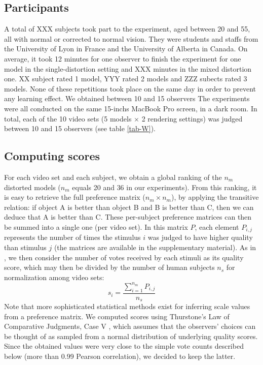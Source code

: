 \subsection{Participants}
A total of XXX subjects took part to the experiment, aged between 20 and 55, all with normal or corrected to normal vision. They were students and staffs from the University of Lyon in France and the University of Alberta in Canada. On average, it took 12 minutes for one observer to finish the experiment for one model in the single-distortion setting and XXX minutes in the mixed distortion one. XX subject rated 1 model, YYY rated 2 models and ZZZ subects rated 3 models. None of these repetitions took place on the same day in order to prevent any learning effect. We obtained between 10 and 15 observers The experiments were all conducted on the same 15-inchs MacBook Pro screen, in a dark room. In total, each of the 10 video sets (5 models $\times$ 2 rendering settings) was judged between 10 and 15 observers (see table \ref{tab-W}).\\
\subsection{Computing scores}
For each video set and each subject, we obtain a global ranking of the $n_m$ distorted models ($n_m$ equals 20 and 36 in our experiments). From this ranking, it is easy to retrieve the full preference matrix ($n_m\times n_m$), by applying the transitive relation: if object A is better than object B and B is better than C, then we can deduce that A is better than C. These per-subject preference matrices can then be summed into a single one (per video set). In this matrix $P$, each element $P_{i,j}$ represents the number of times the stimulus $i$ was judged to have higher quality than stimulus $j$ (the matrices are available in the supplementary material). As in \cite{Ledda2005,Mantiuk2012}, we then consider the number of votes received by each stimuli as its quality score, which may then be divided by the number of human subjects $n_s$ for normalization among video sets:
\begin{equation}
 s_i=\frac{\sum_{i=1}^{n_m}{P_{i,j}}}{n_s}
\end{equation}
Note that more sophisticated statistical methods exist for inferring scale values from a preference matrix. We computed scores using Thurstone’s Law of Comparative Judgments, Case V \cite{Thurstone1927}, which assumes that the observers' choices can be thought of as sampled from a normal distribution of underlying quality scores. Since the obtained values were very close to the simple vote counts described below (more than 0.99 Pearson correlation), we decided to keep the latter.

